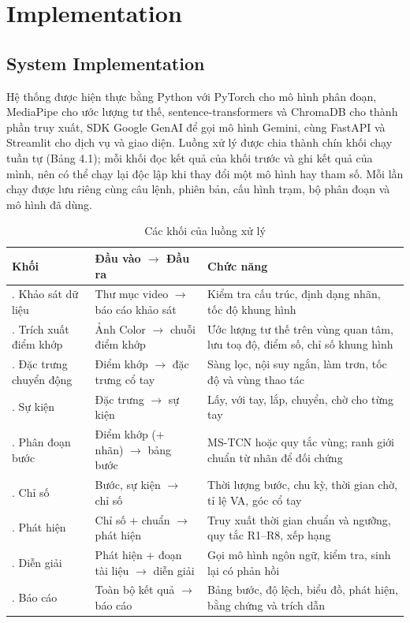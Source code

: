 \section{Implementation}

\subsection{System Implementation}

Hệ thống được hiện thực bằng Python với PyTorch cho mô hình phân đoạn, MediaPipe cho ước lượng tư thế, sentence-transformers và ChromaDB cho thành phần truy xuất, SDK Google GenAI để gọi mô hình Gemini, cùng FastAPI và Streamlit cho dịch vụ và giao diện. Luồng xử lý được chia thành chín khối chạy tuần tự (Bảng 4.1); mỗi khối đọc kết quả của khối trước và ghi kết quả của mình, nên có thể chạy lại độc lập khi thay đổi một mô hình hay tham số. Mỗi lần chạy được lưu riêng cùng câu lệnh, phiên bản, cấu hình trạm, bộ phân đoạn và mô hình đã dùng.

\begin{table}[H]
\centering
\caption{Các khối của luồng xử lý}
\small
\setlength{\tabcolsep}{3pt}\renewcommand{\arraystretch}{1.15}
\begin{tabular}{@{}>{\raggedright\arraybackslash}p{}>{\centering\arraybackslash}p{}>{\centering\arraybackslash}p{}@{}}
\toprule
\textbf{Khối} & \textbf{Đầu vào $\rightarrow$ Đầu ra} & \textbf{Chức năng} \\\midrule
1. Khảo sát dữ liệu & Thư mục video $\rightarrow$ báo cáo khảo sát & Kiểm tra cấu trúc, định dạng nhãn, tốc độ khung hình \\
2. Trích xuất điểm khớp & Ảnh Color $\rightarrow$ chuỗi điểm khớp & Ước lượng tư thế trên vùng quan tâm, lưu toạ độ, điểm số, chỉ số khung hình \\
3. Đặc trưng chuyển động & Điểm khớp $\rightarrow$ đặc trưng cổ tay & Sàng lọc, nội suy ngắn, làm trơn, tốc độ và vùng thao tác \\
4. Sự kiện & Đặc trưng $\rightarrow$ sự kiện & Lấy, với tay, lắp, chuyển, chờ cho từng tay \\
5. Phân đoạn bước & Điểm khớp (+ nhãn) $\rightarrow$ bảng bước & MS-TCN hoặc quy tắc vùng; ranh giới chuẩn từ nhãn để đối chứng \\
6. Chỉ số & Bước, sự kiện $\rightarrow$ chỉ số & Thời lượng bước, chu kỳ, thời gian chờ, tỉ lệ VA, góc cổ tay \\
7. Phát hiện & Chỉ số + chuẩn $\rightarrow$ phát hiện & Truy xuất thời gian chuẩn và ngưỡng, quy tắc R1–R8, xếp hạng \\
8. Diễn giải & Phát hiện + đoạn tài liệu $\rightarrow$ diễn giải & Gọi mô hình ngôn ngữ, kiểm tra, sinh lại có phản hồi \\
9. Báo cáo & Toàn bộ kết quả $\rightarrow$ báo cáo & Bảng bước, độ lệch, biểu đồ, phát hiện, bằng chứng và trích dẫn \\
\bottomrule
\end{tabular}
\end{table}


